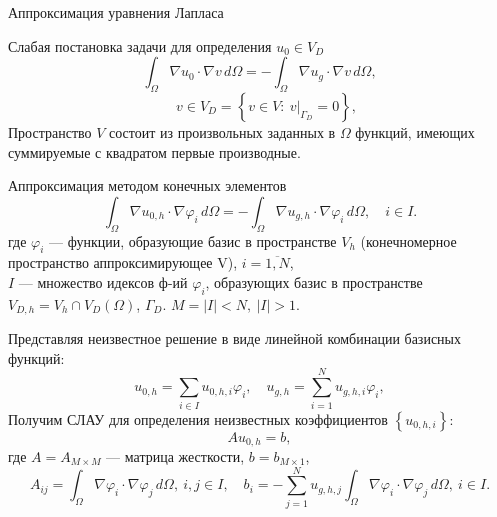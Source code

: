\documentclass[ignoreonframetext,xcolor=table, unicode, 10pt]{beamer}
\renewcommand{\phi}{\varphi}
\begin{document}
\begin{frame}{Аппроксимация уравнения Лапласа}
		\hspace*{-2mm}
		\begin{block}{Слабая постановка задачи для определения $u_0 \in V_D$}
			\begin{equation*}
				\int_{\Omega} \nabla u_0 \cdot \nabla v \, d\Omega = 
				- \int_{\Omega} \nabla u_g \cdot \nabla v \, d\Omega,
			\end{equation*}	
			\begin{equation*}
				\quad v \in V_D = \left\{ v \in V: \ v |_{\Gamma_D} = 0 \right\},
			\end{equation*}
			Пространство $V$ состоит из произвольных заданных в $\Omega$ функций, имеющих суммируемые с квадратом первые производные.
		\end{block}
		
		
	
	
	\normalsize
\end{frame}

\begin{frame}{}
		
		
		\begin{block}{Аппроксимация методом конечных элементов}
			\begin{equation*}
				\int_{\Omega} \nabla u_{0,h} \cdot \nabla \phi_{i} \, d\Omega = 
				- \int_{\Omega} \nabla u_{g,h} \cdot \nabla \phi_{i} \, d\Omega, \quad i \in I. 
			\end{equation*}
			где $\phi_i$ --- функции, образующие базис в пространстве $V_h$ (конечномерное пространство аппроксимирующее V), $ i = \overline{1, N}$,\\
			$I$ --- множество идексов ф-ий $\phi_i$, образующих базис в пространстве 
			$V_{D,h} = V_h \cap V_D(\Omega)$, $\Gamma_D$. $M = |I| < N,\ |I| > 1.$
		\end{block}
		Представляя неизвестное решение в виде линейной комбинации базисных функций:		
		\vspace*{-5mm}
		\begin{equation*}
			u_{0,h} = \sum_{i \in I} u_{0,h,i} \phi_i, \quad 
			u_{g,h} = \sum_{i = 1}^{N} u_{g,h,i} \phi_i, 
		\end{equation*}		
		Получим СЛАУ для определения неизвестных коэффициентов $\left\{u_{0, h, i}\right\}$:
		\begin{equation*}
			A u_{0,h} = b,
			\label{SLE}
		\end{equation*}
		где $A = A_{M \times M}$ --- матрица жесткости, $b = b_{M \times 1}$,
		\begin{equation*}
			A_{ij} = \int_{\Omega} \nabla \phi_i \cdot \nabla \phi_j \, d\Omega,
			\ i, j\in I,
			\quad
			b_i = - \sum_{j=1}^{N} u_{g,h, j} \int_{\Omega} \nabla \phi_i  \cdot \nabla \phi_j \, d\Omega, \  i \in I.
		\end{equation*}
	\normalsize
\end{frame}
\end{document}
